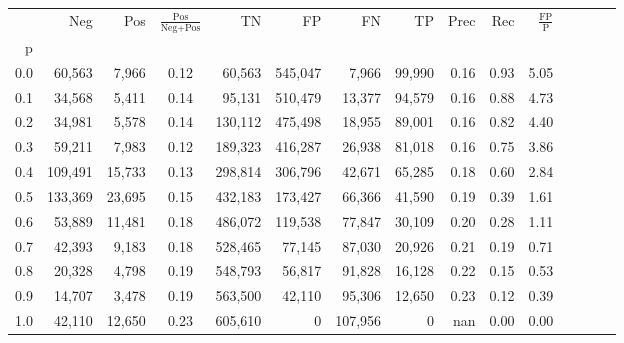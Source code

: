\begin{tabular}{rrrcrrrrrrrrrrr}
\toprule
{} &      Neg &     Pos & $\frac{\text{Pos}}{\text{Neg}+\text{Pos}}$ &       TN &       FP &       FN &      TP &  Prec &   Rec & $\frac{\text{FP}}{\text{P}}$ \\
p   &          &         &                                            &          &          &          &         &       &       &                              \\
\midrule
0.0 &   60,563 &   7,966 &                                       0.12 &   60,563 &  545,047 &    7,966 &  99,990 &  0.16 &  0.93 &                         5.05 \\
0.1 &   34,568 &   5,411 &                                       0.14 &   95,131 &  510,479 &   13,377 &  94,579 &  0.16 &  0.88 &                         4.73 \\
0.2 &   34,981 &   5,578 &                                       0.14 &  130,112 &  475,498 &   18,955 &  89,001 &  0.16 &  0.82 &                         4.40 \\
0.3 &   59,211 &   7,983 &                                       0.12 &  189,323 &  416,287 &   26,938 &  81,018 &  0.16 &  0.75 &                         3.86 \\
0.4 &  109,491 &  15,733 &                                       0.13 &  298,814 &  306,796 &   42,671 &  65,285 &  0.18 &  0.60 &                         2.84 \\
0.5 &  133,369 &  23,695 &                                       0.15 &  432,183 &  173,427 &   66,366 &  41,590 &  0.19 &  0.39 &                         1.61 \\
0.6 &   53,889 &  11,481 &                                       0.18 &  486,072 &  119,538 &   77,847 &  30,109 &  0.20 &  0.28 &                         1.11 \\
0.7 &   42,393 &   9,183 &                                       0.18 &  528,465 &   77,145 &   87,030 &  20,926 &  0.21 &  0.19 &                         0.71 \\
0.8 &   20,328 &   4,798 &                                       0.19 &  548,793 &   56,817 &   91,828 &  16,128 &  0.22 &  0.15 &                         0.53 \\
0.9 &   14,707 &   3,478 &                                       0.19 &  563,500 &   42,110 &   95,306 &  12,650 &  0.23 &  0.12 &                         0.39 \\
1.0 &   42,110 &  12,650 &                                       0.23 &  605,610 &        0 &  107,956 &       0 &   nan &  0.00 &                         0.00 \\
\bottomrule
\end{tabular}
